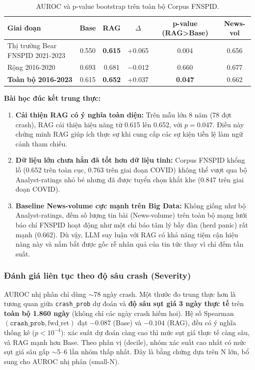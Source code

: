 \documentclass[11pt, a4paper]{article}
\begin{document}
\begin{table}[H]
    \centering
    \renewcommand{\arraystretch}{1.2}
    \begin{tabularx}{\textwidth}{@{} l c c c c c @{}}
    \toprule
    \textbf{Giai đoạn} & \textbf{Base} & \textbf{RAG} & \textbf{$\Delta$} & \textbf{p-value (RAG>Base)} & \textbf{News-vol} \\
    \midrule
    Thị trường Bear FNSPID 2021-2023 & 0.550 & \textbf{0.615} & +0.065 & 0.004 & 0.656 \\
    Rộng 2016-2020 & 0.693 & 0.681 & $-0.012$ & 0.660 & 0.677 \\
    \textbf{Toàn bộ 2016-2023} & 0.615 & \textbf{0.652} & +0.037 & \textbf{0.047} & 0.662 \\
    \bottomrule
    \end{tabularx}
    \caption{AUROC và p-value bootstrap trên toàn bộ Corpus FNSPID.}
    \label{tab:corpus_results}
\end{table}

\textbf{Bài học đúc kết trung thực:}
\begin{enumerate}
    \item \textbf{Cải thiện RAG có ý nghĩa toàn diện:} Trên mẫu lớn 8 năm (78 đợt crash), RAG cải thiện hiệu năng từ 0.615 lên 0.652, với $p=0.047$. Điều này chứng minh RAG giúp ích thực sự khi cung cấp các sự kiện tiền lệ làm ngữ cảnh tham chiếu.
    \item \textbf{Dữ liệu lớn chưa hẳn đã tốt hơn dữ liệu tinh:} Corpus FNSPID khổng lồ (0.652 trên toàn cục, 0.763 trên giai đoạn COVID) không thể vượt qua bộ Analyst-ratings nhỏ bé nhưng đã được tuyển chọn khắt khe (0.847 trên giai đoạn COVID). 
    \item \textbf{Baseline News-volume cực mạnh trên Big Data:} Không giống như bộ Analyst-ratings, đếm số lượng tin bài (News-volume) trên toàn bộ mạng lưới báo chí FNSPID hoạt động như một chỉ báo tâm lý bầy đàn (herd panic) rất mạnh (0.662). Dù vậy, LLM suy luận với RAG có khả năng tiệm cận hiệu năng này và nắm bắt được gốc rễ nhân quả của tin tức thay vì chỉ đếm tần suất.
\end{enumerate}

\subsubsection{Đánh giá liên tục theo độ sâu crash (Severity)}
AUROC nhị phân chỉ dùng $\sim$78 ngày crash. Một thước đo trung thực hơn là tương quan giữa \texttt{crash\_prob} dự đoán và \textbf{độ sâu sụt giá 3 ngày thực tế} trên \textbf{toàn bộ 1.860 ngày} (không chỉ các ngày crash hiếm hoi). Hệ số Spearman$(\texttt{crash\_prob}, \text{fwd\_ret})$ đạt $-0.087$ (Base) và $\mathbf{-0.104}$ (RAG), đều có ý nghĩa thống kê ($p<10^{-4}$): xác suất dự đoán càng cao thì mức sụt giá thực tế càng sâu, và RAG mạnh hơn Base. Theo phân vị (decile), nhóm xác suất cao nhất có mức sụt giá sâu gấp $\sim$5--6 lần nhóm thấp nhất. Đây là bằng chứng dựa trên N lớn, bổ sung cho AUROC nhị phân (small-N).
\end{document}
